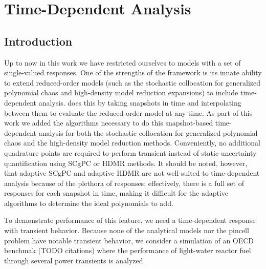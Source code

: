
\chapter{Time-Dependent Analysis} %

\label{ch:timedep} %



\section{Introduction}

Up to now in this work we have restricted ourselves to models with a set of single-valued responses.  One of the strengths
of the \raven{} framework is its innate ability to extend reduced-order models (such as the stochastic 
collocation for generalized polynomial chaos and high-density model reduction expansions) to
include time-dependent analysis.  \raven{} does this by taking snapshots in time and interpolating between them to evaluate
the reduced-order model at any time.  As part of this work we added the algorithms necessary to do this snapshot-based
time-dependent analysis for both the stochastic collocation for generalized polynomial chaos and the high-density model
reduction methods. Conveniently, no additional quadrature points are required to perform transient instead of static
uncertainty quantification using SCgPC or HDMR methods.  It should be noted, however, that adaptive SCgPC and adaptive
HDMR are not well-suited to time-dependent analysis because of the plethora of responses; effectively, there is a
full set of responses for each snapshot in time, making it difficult for the adaptive algorithms to determine the
ideal polynomials to add.

To demonstrate performance of this feature, we need a time-dependent response with transient behavior.
Because none of the analytical models nor the \mammoth{} pincell problem have notable transient behavior, we consider
a \bison{} simulation of an OECD benchmak (TODO citations) where the performance of light-water reactor fuel 
through several power transients is
analyzed.

